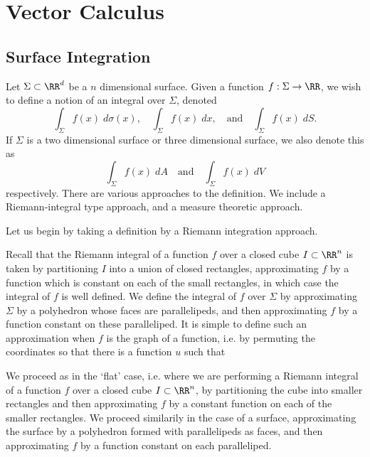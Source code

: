 \chapter{Vector Calculus}

\section{Surface Integration}

Let $\Sigma \subset \RR^d$ be a $n$ dimensional surface. Given a function $f: \Sigma \to \RR$, we wish to define a notion of an integral over $\Sigma$, denoted
%
\[ \int_\Sigma f(x)\; d\sigma(x),\quad \int_\Sigma f(x)\; dx,\quad \text{and}\quad \int_\Sigma f(x)\; dS. \]
%
If $\Sigma$ is a two dimensional surface or three dimensional surface, we also denote this as
%
\[ \int_\Sigma f(x)\; dA \quad\text{and}\quad \int_\Sigma f(x)\; dV \]
%
respectively. There are various approaches to the definition. We include a Riemann-integral type approach, and a measure theoretic approach.

Let us begin by taking a definition by a Riemann integration approach. 


Recall that the Riemann integral of a function $f$ over a closed cube $I \subset \RR^n$ is taken by partitioning $I$ into a union of closed rectangles, approximating $f$ by a function which is constant on each of the small rectangles, in which case the integral of $f$ is well defined. We define the integral of $f$ over $\Sigma$ by approximating $\Sigma$ by a polyhedron whose faces are parallelipeds, and then approximating $f$ by a function constant on these paralleliped. It is simple to define such an approximation when $f$ is the graph of a function, i.e. by permuting the coordinates so that there is a function $u$ such that 


We proceed as in the `flat' case, i.e. where we are performing a Riemann integral of a function $f$ over a closed cube $I \subset \RR^n$, by partitioning the cube into smaller rectangles and then approximating $f$ by a constant function on each of the smaller rectangles. We proceed similarily in the case of a surface, approximating the surface by a polyhedron formed with parallelipeds as faces, and then approximating $f$ by a function constant on each paralleliped.



